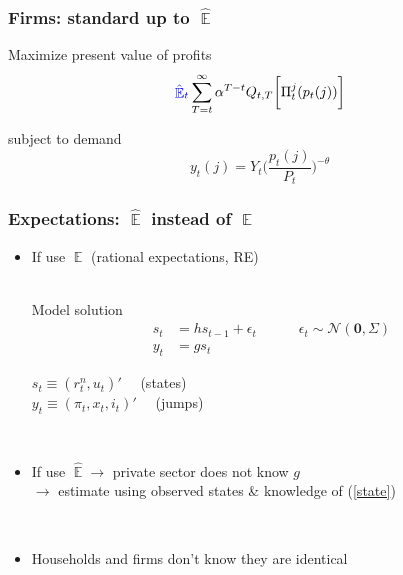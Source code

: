\documentclass[11pt]{beamer}
\DeclareMathOperator{\E}{\mathbb{E}}
\begin{document}
\begin{frame}
	\frametitle{Firms: standard up to $\hat{\E}$}

Maximize present value of profits
\begin{equation}
\textcolor{blue}{\hat{\E}_t}\sum^{\infty}_{T=t}\alpha^{T-t} Q_{t,T} \bigg[ \Pi^j_t(p_t(j))\bigg]
\label{lifetime_profits}
\end{equation}

subject to demand
\begin{equation}
y_t(j) = Y_t \bigg(\frac{p_t(j)}{P_t}\bigg)^{-\theta}
\end{equation}


\vfill

\hfill \hyperlink{details_HHs_firms}{}

\end{frame}

\begin{frame}
	\frametitle{Expectations: $\hat{\E}$ instead of $\E$}

\begin{itemize}
\item If use $\E$ (rational expectations, RE) \\

\

Model solution 
 \begin{align}
 s_t & = h s_{t-1} + \epsilon_t \quad \quad \quad \epsilon_t \sim \mathcal{N}(\mathbf{0},\Sigma) \label{state} \\
 y_t & = g s_t \label{obs_RE}
 \end{align}


$s_t \equiv (r^n_t, u_t)' \quad $  (states) \\
$y_t \equiv (\pi_t, x_t, i_t)' \quad $ (jumps)

\

\item If use $\hat{\E} \rightarrow$ private sector does not know $g$ \\
$\rightarrow$ estimate using observed states \& knowledge of (\ref{state})

\

\item Households and firms don't know they are identical
\end{itemize}



\end{frame}
\end{document}
